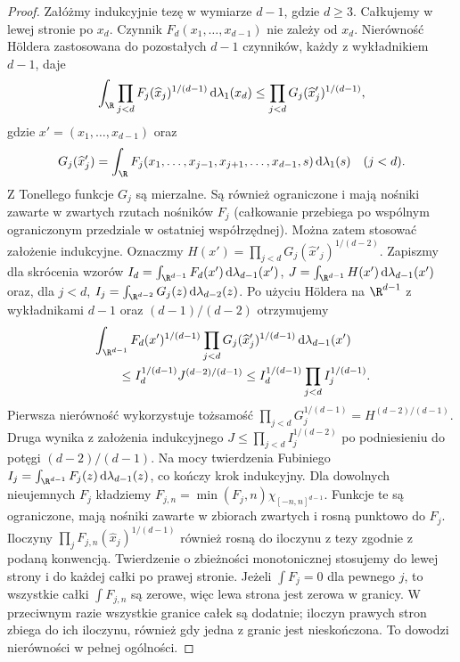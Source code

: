 \begin{proof}
Załóżmy indukcyjnie tezę w wymiarze $d-1$, gdzie $d\ge3$.
Całkujemy w lewej stronie po $x_d$. Czynnik
$F_d(x_1,\ldots,x_{d-1})$ nie zależy od $x_d$.
Nierówność H\"oldera zastosowana do pozostałych $d-1$
czynników, każdy z wykładnikiem $d-1$, daje
\[
 \int_{\R}\prod_{j<d}F_j(\widehat x_j)^{1/(d-1)}
 \,\mathrm d\lambda_1(x_d)
 \le\prod_{j<d}G_j(\widehat x^{\prime}_j)^{1/(d-1)},
\]
gdzie $x'=(x_1,\ldots,x_{d-1})$ oraz
\[
 G_j(\widehat x'_j)=\int_\R
 F_j(x_1,\ldots,x_{j-1},x_{j+1},\ldots,x_{d-1},s)
 \,\mathrm d\lambda_1(s)\quad(j<d).
\]
Z Tonellego funkcje $G_j$ są mierzalne. Są również
ograniczone i mają nośniki zawarte w zwartych rzutach
nośników $F_j$ (całkowanie przebiega po wspólnym
ograniczonym przedziale w ostatniej współrzędnej).
Można zatem stosować założenie indukcyjne.
Oznaczmy $H(x')=\prod_{j<d}G_j(\widehat x'_j)^{1/(d-2)}$.
Zapiszmy dla skrócenia wzorów
$I_d=\int_{\R^{d-1}}F_d(x')\,\mathrm d\lambda_{d-1}(x')$,
$J=\int_{\R^{d-1}}H(x')\,\mathrm d\lambda_{d-1}(x')$
oraz, dla $j<d$,
$I_j=\int_{\R^{d-2}}G_j(z)\,\mathrm d\lambda_{d-2}(z)$.
Po użyciu H\"oldera na $\R^{d-1}$ z wykładnikami
$d-1$ oraz $(d-1)/(d-2)$ otrzymujemy
\begin{align*}
 &\int_{\R^{d-1}}F_d(x')^{1/(d-1)}
 \prod_{j<d}G_j(\widehat x'_j)^{1/(d-1)}
 \,\mathrm d\lambda_{d-1}(x')\\
 &\qquad\le I_d^{1/(d-1)}J^{(d-2)/(d-1)}
 \le I_d^{1/(d-1)}\prod_{j<d} I_j^{1/(d-1)}.
\end{align*}
Pierwsza nierówność wykorzystuje tożsamość
$\prod_{j<d}G_j^{1/(d-1)}=H^{(d-2)/(d-1)}$.
Druga wynika z założenia indukcyjnego
$J\le\prod_{j<d} I_j^{1/(d-2)}$ po podniesieniu
do potęgi $(d-2)/(d-1)$.
Na mocy twierdzenia Fubiniego
$I_j=\int_{\R^{d-1}}F_j(z)\,\mathrm d\lambda_{d-1}(z)$,
co kończy krok indukcyjny. Dla dowolnych nieujemnych $F_j$
kładziemy
$F_{j,n}=\min(F_j,n)\chi_{[-n,n]^{d-1}}$.
Funkcje te są ograniczone, mają nośniki zawarte w zbiorach
zwartych i rosną punktowo do $F_j$. Iloczyny
$\prod_j F_{j,n}(\widehat x_j)^{1/(d-1)}$ również rosną
do iloczynu z tezy zgodnie z podaną konwencją.
Twierdzenie o zbieżności monotonicznej stosujemy do lewej
strony i do każdej całki po prawej stronie.
Jeżeli $\int F_j=0$ dla pewnego $j$, to wszystkie całki
$\int F_{j,n}$ są zerowe, więc lewa strona jest zerowa
w granicy. W przeciwnym razie wszystkie granice całek
są dodatnie; iloczyn prawych stron zbiega do ich iloczynu,
również gdy jedna z granic jest nieskończona.
To dowodzi nierówności w pełnej ogólności.
\end{proof}

